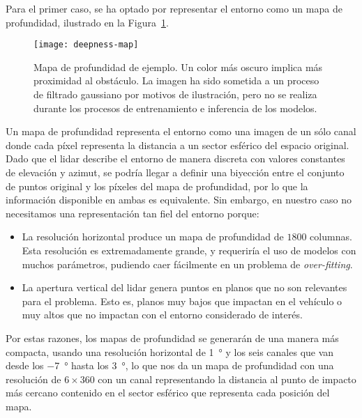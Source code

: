Para el primer caso, se ha optado por representar el entorno como un mapa de profundidad, ilustrado en la Figura~\ref{fig:deepmap-example}.

\begin{figure}
	\centering
	\texttt{[image: deepness-map]}
	\caption[Mapa de profundidad de ejemplo]{Mapa de profundidad de ejemplo. Un color más oscuro implica más proximidad al obstáculo. La imagen ha sido sometida a un proceso de filtrado gaussiano por motivos de ilustración, pero no se realiza durante los procesos de entrenamiento e inferencia de los modelos.}
	\label{fig:deepmap-example}
\end{figure}

Un mapa de profundidad representa el entorno como una imagen de un sólo canal donde cada píxel representa la distancia a un sector esférico del espacio original. Dado que el \acrshort{lidar} describe el entorno de manera discreta con valores constantes de elevación y azimut, se podría llegar a definir una biyección entre el conjunto de puntos original y los píxeles del mapa de profundidad, por lo que la información disponible en ambas es equivalente. Sin embargo, en nuestro caso no necesitamos una representación tan fiel del entorno porque:

\begin{itemize}
	\item La resolución horizontal produce un mapa de profundidad de $1800$ columnas. Esta resolución es extremadamente grande, y requeriría el uso de modelos con muchos parámetros, pudiendo caer fácilmente en un problema de \textit{over-fitting}.
	\item La apertura vertical del \acrshort{lidar} genera puntos en planos que no son relevantes para el problema. Esto es, planos muy bajos que impactan en el vehículo o muy altos que no impactan con el entorno considerado de interés.
\end{itemize}

Por estas razones, los mapas de profundidad se generarán de una manera más compacta, usando una resolución horizontal de \SI{1}{\degree} y los seis canales que van desde los \SI{-7}{\degree} hasta los \SI{3}{\degree}, lo que nos da un mapa de profundidad con una resolución de $6 \times 360$ con un canal representando la distancia al punto de impacto más cercano contenido en el sector esférico que representa cada posición del mapa.

